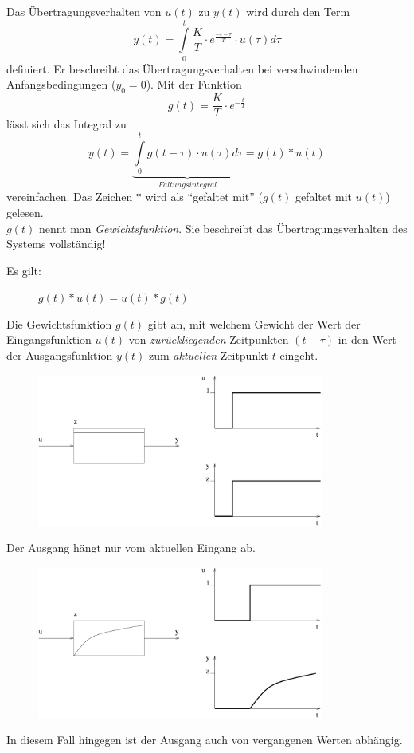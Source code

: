 \documentclass[12pt,a4paper,ngerman]{scrartcl}
\begin{document}
Das Übertragungsverhalten von $u(t)$ zu $y(t)$ wird durch den Term
\begin{equation*}
  y(t)=\int\limits_0^t{\frac{K}{T}\cdot e^{\frac{-t-\tau}{T}}\cdot u(\tau)d\tau}
\end{equation*}
definiert. Er beschreibt das Übertragungsverhalten bei verschwindenden Anfangsbedingungen ($y_0=0$). Mit der Funktion
\begin{equation*}
  g(t)=\frac{K}{T}\cdot e^{-\frac{t}{T}}
\end{equation*}
lässt sich das Integral zu
\begin{equation*}
  y(t)=\underbrace{\int\limits_0^t{g(t-\tau)\cdot u(\tau)d\tau}}_{Faltungsintegral}=g(t)*u(t)
\end{equation*}
vereinfachen. Das Zeichen $*$ wird als ``gefaltet mit'' ($g(t)$ gefaltet mit $u(t)$) gelesen. \\
$g(t)$ nennt man \emph{Gewichtsfunktion}. Sie beschreibt das Übertragungsverhalten des Systems vollständig!

\begin{description}
\item[Es gilt:] $g(t)*u(t)=u(t)*g(t)$
\end{description}
Die Gewichtsfunktion $g(t)$ gibt an, mit welchem Gewicht der Wert der Eingangsfunktion $u(t)$ von \emph{zurückliegenden} Zeitpunkten $(t-\tau)$ in den Wert der Ausgangsfunktion $y(t)$ zum \emph{aktuellen} Zeitpunkt $t$ eingeht.\\
\begin{figure}[H]
  \centering
  \includegraphics[height=5cm]{sysregel_gewfkt_1}
\end{figure}
Der Ausgang hängt nur vom aktuellen Eingang ab.
\begin{figure}[H]
  \centering
  \includegraphics[height=5cm]{sysregel_gewfkt_2}
\end{figure}
In diesem Fall hingegen ist der Ausgang auch von vergangenen Werten abhängig.
\end{document}
